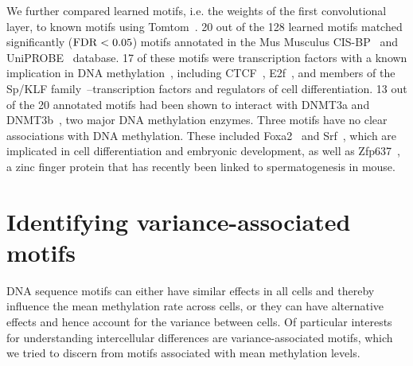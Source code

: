 We further compared learned motifs, i.e. the weights of the first convolutional layer, to known motifs using Tomtom~\citep{bailey_meme_2009}. 20 out of the 128 learned motifs matched significantly ($\operatorname{FDR}<0.05$) motifs annotated in the Mus Musculus CIS-BP~\citep{weirauch_determination_2014} and UniPROBE~\citep{newburger_uniprobe:_2009} database. 17 of these motifs were transcription factors with a known implication in DNA methylation~\citep{hervouet_dnmt3/transcription_2009,luu_disclosing_2013,whitaker_predicting_2015}, including CTCF~\citep{kim_analysis_2007}, E2f~\citep{tsai_mouse_2008}, and members of the Sp/KLF family~\citep{fernandez-zapico_functional_2011}--transcription factors and regulators of cell differentiation. 13 out of the 20 annotated motifs had been shown to interact with DNMT3a and DNMT3b~\citep{hervouet_dnmt3/transcription_2009}, two major DNA methylation enzymes. Three motifs have no clear associations with DNA methylation. These included Foxa2~\citep{lee_foxa2_2005,wan_compensatory_2005} and Srf~\citep{arsenian_serum_1998,marais_srf_1993}, which are implicated in cell differentiation and embryonic development, as well as Zfp637~\citep{huang_il-6_2016,quenneville_embryonic_2011}, a zinc finger protein that has recently been linked to spermatogenesis in mouse.


\section{Identifying variance-associated motifs}

DNA sequence motifs can either have similar effects in all cells and thereby influence the mean methylation rate across cells, or they can have alternative effects and hence account for the variance between cells. Of particular interests for understanding intercellular differences are variance-associated motifs, which we tried to discern from motifs associated with mean methylation levels.

